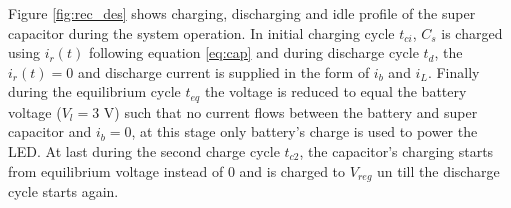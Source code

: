 Figure \ref{fig:rec_des}
shows charging, discharging and idle profile of the super capacitor during the system operation. In initial charging cycle $t_{ci}$, $C_s$ is charged using $i_r(t)$ following equation \ref{eq:cap} and during discharge cycle $t_d$, the $i_r(t) = 0$ and discharge current is supplied in the form of $i_b$ and $i_L$. Finally during the equilibrium cycle $t_{eq}$ the voltage is reduced to equal the battery voltage ($V_l = 3$ V) such that no current flows between the battery and super capacitor and $i_b = 0$, at this stage only battery's charge is used to power the LED. At last during the second charge cycle $t_{c2}$, the capacitor's charging starts from equilibrium voltage instead of 0 and is charged to $V_{reg}$ un till the discharge cycle starts again.
